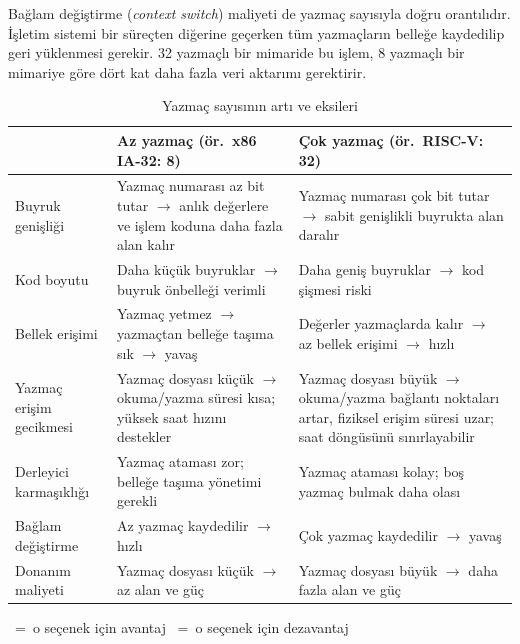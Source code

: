 Bağlam değiştirme (\emph{context switch}) maliyeti de yazmaç sayısıyla doğru orantılıdır. İşletim sistemi bir süreçten diğerine geçerken tüm yazmaçların belleğe kaydedilip geri yüklenmesi gerekir. 32 yazmaçlı bir mimaride bu işlem, 8 yazmaçlı bir mimariye göre dört kat daha fazla veri aktarımı gerektirir.

\newcommand{\artii}{\textcolor{green!60!black}{\ding{51}}\;}
\newcommand{\eksii}{\textcolor{red!70!black}{\ding{55}}\;}

\begin{table}[H]
\centering
\caption{Yazmaç sayısının artı ve eksileri}
\label{tab:yazmac-sayisi-dengeleri}
\small
\begin{tabular}{p{3.2cm}p{5.3cm}p{5.3cm}}
\toprule
 & \textbf{Az yazmaç} (ör.\ x86 IA-32: 8) & \textbf{Çok yazmaç} (ör.\ RISC-V: 32) \\
\midrule
Buyruk genişliği & \artii Yazmaç numarası az bit tutar $\rightarrow$ anlık değerlere ve işlem koduna daha fazla alan kalır & \eksii Yazmaç numarası çok bit tutar $\rightarrow$ sabit genişlikli buyrukta alan daralır \\[4pt]
Kod boyutu & \artii Daha küçük buyruklar $\rightarrow$ buyruk önbelleği verimli & \eksii Daha geniş buyruklar $\rightarrow$ kod şişmesi riski \\[4pt]
Bellek erişimi & \eksii Yazmaç yetmez $\rightarrow$ yazmaçtan belleğe taşıma sık $\rightarrow$ yavaş & \artii Değerler yazmaçlarda kalır $\rightarrow$ az bellek erişimi $\rightarrow$ hızlı \\[4pt]
Yazmaç erişim gecikmesi & \artii Yazmaç dosyası küçük $\rightarrow$ okuma/yazma süresi kısa; yüksek saat hızını destekler & \eksii Yazmaç dosyası büyük $\rightarrow$ okuma/yazma bağlantı noktaları artar, fiziksel erişim süresi uzar; saat döngüsünü sınırlayabilir \\[4pt]
Derleyici karmaşıklığı & \eksii Yazmaç ataması zor; belleğe taşıma yönetimi gerekli & \artii Yazmaç ataması kolay; boş yazmaç bulmak daha olası \\[4pt]
Bağlam değiştirme & \artii Az yazmaç kaydedilir $\rightarrow$ hızlı & \eksii Çok yazmaç kaydedilir $\rightarrow$ yavaş \\[4pt]
Donanım maliyeti & \artii Yazmaç dosyası küçük $\rightarrow$ az alan ve güç & \eksii Yazmaç dosyası büyük $\rightarrow$ daha fazla alan ve güç \\
\bottomrule
\end{tabular}

\medskip
\footnotesize
\textcolor{green!60!black}{}~=~o seçenek için avantaj \quad
\textcolor{red!70!black}{}~=~o seçenek için dezavantaj
\end{table}

